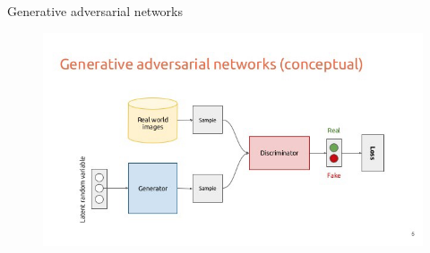 \documentclass[handout]{beamer}
\begin{document}
\begin{frame}{Generative adversarial networks}
    \begin{figure}
        \centering
    \includegraphics[width=.9\textwidth]{fig/L2/GAN.png}
  \end{figure}
    
\end{frame}
\end{document}
